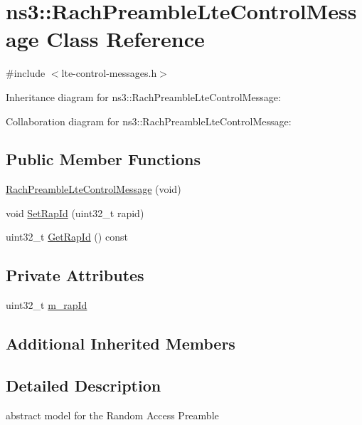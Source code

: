 \hypertarget{classns3_1_1RachPreambleLteControlMessage}{}\section{ns3\+:\+:Rach\+Preamble\+Lte\+Control\+Message Class Reference}
\label{classns3_1_1RachPreambleLteControlMessage}


{\ttfamily \#include $<$lte-\/control-\/messages.\+h$>$}



Inheritance diagram for ns3\+:\+:Rach\+Preamble\+Lte\+Control\+Message\+:


Collaboration diagram for ns3\+:\+:Rach\+Preamble\+Lte\+Control\+Message\+:
\subsection*{Public Member Functions}
\begin{DoxyCompactItemize}
\item 
\hyperlink{classns3_1_1RachPreambleLteControlMessage_a59625465287569f2ecae133cc637a8c8}{Rach\+Preamble\+Lte\+Control\+Message} (void)
\item 
void \hyperlink{classns3_1_1RachPreambleLteControlMessage_aa39578ef862f6bacd4fdf7bae8585f22}{Set\+Rap\+Id} (uint32\+\_\+t rapid)
\item 
uint32\+\_\+t \hyperlink{classns3_1_1RachPreambleLteControlMessage_a39bdce258baddf1cb749e796798435f3}{Get\+Rap\+Id} () const 
\end{DoxyCompactItemize}
\subsection*{Private Attributes}
\begin{DoxyCompactItemize}
\item 
uint32\+\_\+t \hyperlink{classns3_1_1RachPreambleLteControlMessage_a943c80b1bd9aced8c5385c292193819d}{m\+\_\+rap\+Id}
\end{DoxyCompactItemize}
\subsection*{Additional Inherited Members}


\subsection{Detailed Description}
abstract model for the Random Access Preamble 

